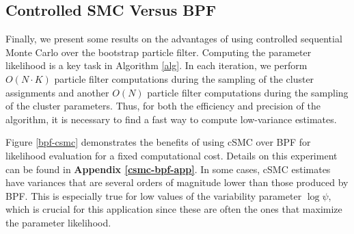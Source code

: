 \documentclass[twoside]{article}
\begin{document}
%


\subsection{Controlled SMC Versus BPF} \label{ssec:bpf-csmc}
Finally, we present some results on the advantages of using controlled sequential Monte Carlo over the bootstrap particle filter. Computing the parameter likelihood is a key task in Algorithm \ref{alg}. In each iteration, we perform $O(N \cdot K)$ particle filter computations during the sampling of the cluster assignments and another $O(N)$ particle filter computations during the sampling of the cluster parameters. Thus, for both the efficiency and precision of the algorithm, it is necessary to find a fast way to compute low-variance estimates. 

Figure \ref{bpf-csmc} demonstrates the benefits of using cSMC over BPF for likelihood evaluation for a fixed computational cost.  Details on this experiment can be found in \textbf{Appendix \ref{csmc-bpf-app}}. In some cases, cSMC estimates have variances that are several orders of magnitude lower than those produced by BPF.  This is especially true for low values of the variability parameter $\log \psi$, which is crucial for this application since these are often the ones that maximize the parameter likelihood.  
\end{document}
